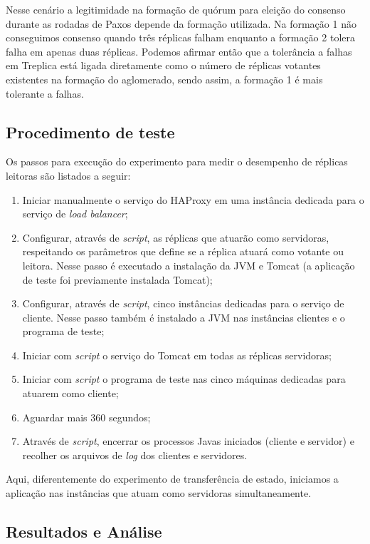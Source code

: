Nesse cenário a legitimidade na formação de quórum para eleição do consenso durante as
rodadas de Paxos depende da formação utilizada. Na formação 1 não conseguimos consenso
quando três réplicas falham enquanto a formação 2 tolera falha em apenas duas réplicas.
Podemos afirmar então que a tolerância a falhas em Treplica está ligada diretamente como o
número de réplicas votantes existentes na formação do aglomerado, sendo assim, a formação
1 é mais tolerante a falhas.

\subsection{Procedimento de teste}\label{subsec:procedimento_teste_leitora}

Os passos para execução do experimento para medir o desempenho de réplicas leitoras são
listados a seguir:

\begin{enumerate}
  \item Iniciar manualmente o serviço do HAProxy em uma instância dedicada para o serviço
    de \emph{load balancer};
  \item Configurar, através de \emph{script}, as réplicas que atuarão como servidoras,
    respeitando os parâmetros que define se a réplica atuará como votante ou leitora.
    Nesse passo é executado a instalação da JVM e Tomcat (a aplicação de teste foi
    previamente instalada Tomcat);
  \item Configurar, através de \emph{script}, cinco instâncias dedicadas para o serviço de
    cliente. Nesse passo também é instalado a JVM nas instâncias clientes e o programa de
    teste;
  \item Iniciar com \emph{script} o serviço do Tomcat em todas as réplicas servidoras;
  \item Iniciar com \emph{script} o programa de teste nas cinco máquinas dedicadas para
    atuarem como cliente;
  \item Aguardar mais 360 segundos;
  \item Através de \emph{script}, encerrar os processos Javas iniciados (cliente e
    servidor) e recolher os arquivos de \emph{log} dos clientes e servidores.
\end{enumerate}

Aqui, diferentemente do experimento de transferência de estado, iniciamos a aplicação nas
instâncias que atuam como servidoras simultaneamente.

\subsection{Resultados e Análise}

